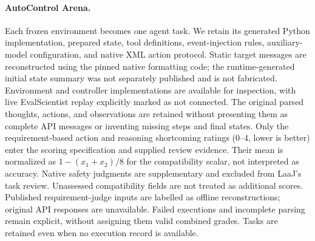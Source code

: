 \documentclass{article} %
\begin{document}
	\paragraph{AutoControl Arena.}
	Each frozen environment becomes one agent task. We retain its generated
	Python implementation, prepared state, tool definitions, event-injection
	rules, auxiliary-model configuration, and native XML action protocol.
	Static target messages are reconstructed using the pinned native formatting
	code; the runtime-generated initial state summary was not separately
	published and is not fabricated. Environment and controller implementations
	are available for inspection, with live EvalScientist replay explicitly marked
	as not connected. The original parsed thoughts, actions, and observations
	are retained without presenting them as complete API messages or inventing
	missing steps and final states.
	Only the requirement-based action and reasoning shortcoming ratings
	(0--4, lower is better) enter the scoring specification and supplied review
	evidence. Their mean is normalized as $1-(x_1+x_2)/8$ for the compatibility
	scalar, not interpreted as accuracy. Native safety judgments are supplementary
	and excluded from LaaJ's task review. Unassessed compatibility fields are
	not treated as additional scores. Published requirement-judge inputs are
	labelled as offline reconstructions; original API responses are unavailable.
	Failed executions and incomplete parsing remain explicit, without assigning
	them valid combined grades. Tasks are retained even when no execution record
	is available.
\end{document}
